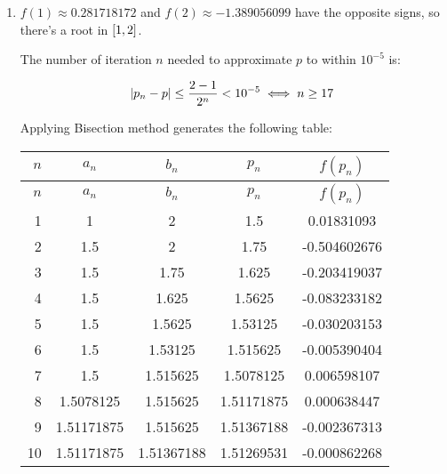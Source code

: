 \documentclass[../../../../Assignments.tex]{subfiles}
\begin{document}
\begin{solution}
    \begin{enumerate}[label = (\alph*)]
        \item \(f(1) \approx \num{0.281718172}\) and \(f(2) \approx
            \num{-1.389056099}\) have the opposite signs, so there's a root in
            \(\interval{1}{2}\).

            The number of iteration \(n\) needed to approximate \(p\) to within
            \(10^{-5}\) is:

            \[\abs{p_n - p} \leq \frac{2 - 1}{2^n} < 10^{-5} \iff n \geq 17\]

            Applying Bisection method generates the following table:

            \begin{longtable}{r S[table-format=1.8] S[table-format=1.8] S[table-format=1.8] S[table-format=-1.9]}
                \toprule
                \(n\)  &   {\(a_n\)}   &   {\(b_n\)}   &   {\(p_n\)}   &  {\(f(p_n)\)}  \\
                \midrule
                \endfirsthead
                \(n\)  &   {\(a_n\)}   &   {\(b_n\)}   &   {\(p_n\)}   &  {\(f(p_n)\)}  \\
                \midrule
                  &  1            &  2            &  1.5          &   0.01831093   \\
                    2  &  1.5          &  2            &  1.75         &  -0.504602676  \\
                    3  &  1.5          &  1.75         &  1.625        &  -0.203419037  \\
                    4  &  1.5          &  1.625        &  1.5625       &  -0.083233182  \\
                    5  &  1.5          &  1.5625       &  1.53125      &  -0.030203153  \\
                    6  &  1.5          &  1.53125      &  1.515625     &  -0.005390404  \\
                    7  &  1.5          &  1.515625     &  1.5078125    &   0.006598107  \\
                    8  &  1.5078125    &  1.515625     &  1.51171875   &   0.000638447  \\
                    9  &  1.51171875   &  1.515625     &  1.51367188   &  -0.002367313  \\
                   10  &  1.51171875   &  1.51367188   &  1.51269531   &  -0.000862268  \\

\end{longtable}
\end{enumerate}
\end{solution}
\end{document}
